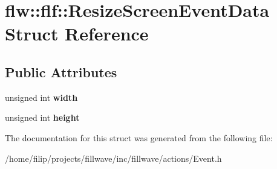 \hypertarget{structflw_1_1flf_1_1ResizeScreenEventData}{}\section{flw\+:\+:flf\+:\+:Resize\+Screen\+Event\+Data Struct Reference}
\label{structflw_1_1flf_1_1ResizeScreenEventData}
\subsection*{Public Attributes}
\begin{DoxyCompactItemize}
\item 
\mbox{\label{structflw_1_1flf_1_1ResizeScreenEventData_a9977f0375cafe636a0ece33ec2d82aee}} 
unsigned int {\bfseries width}
\item 
\mbox{\label{structflw_1_1flf_1_1ResizeScreenEventData_ab42ad852f00d520acdb7bba360a02f63}} 
unsigned int {\bfseries height}
\end{DoxyCompactItemize}


The documentation for this struct was generated from the following file\+:\begin{DoxyCompactItemize}
\item 
/home/filip/projects/fillwave/inc/fillwave/actions/Event.\+h\end{DoxyCompactItemize}
